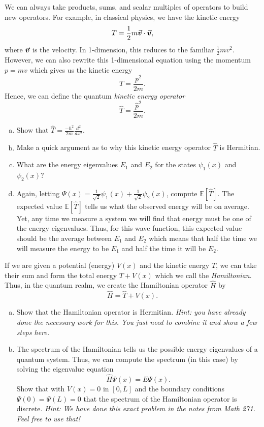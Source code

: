 \documentclass[12pt]{article} %
\begin{document}
\begin{problem}
	We can always take products, sums, and scalar multiples of operators to build new operators.  For example, in classical physics, we have the kinetic energy
	\[
	T=\frac{1}{2}m \boldsymbol{\vec{v}} \cdot \boldsymbol{\vec{v}},
	\]
	where $\boldsymbol{\vec{v}}$ is the velocity. In 1-dimension, this reduces to the familiar $\frac{1}{2}mv^2$.  However, we can also rewrite this 1-dimensional equation using the momentum $p=mv$ which gives us the kinetic energy
	\[
	T=\frac{p^2}{2m}.
	\]
	Hence, we can define the quantum \emph{kinetic energy operator}
	\[
	\hat{T}=\frac{\hat{p}^2}{2m}.
	\]
	\begin{enumerate}[(a)]
		\item Show that $\hat{T} = \frac{-\hbar^2}{2m}\frac{d^2}{dx^2}$.
		\item Make a quick argument as to why this kinetic energy operator $\hat{T}$ is Hermitian.
		\item What are the energy eigenvalues $E_1$ and $E_2$ for the states $\psi_1(x)$ and $\psi_2(x)$?
		\item Again, letting $\Psi(x)=\frac{1}{\sqrt{2}}\psi_1(x)+\frac{1}{\sqrt{2}}\psi_2(x)$, compute $\mathbb{E}[\hat{T}]$. The expected value $\mathbb{E}[\hat{T}]$ tells us what the observed energy will be on average. Yet, any time we measure a system we will find that energy must be one of the energy eigenvalues. Thus, for this wave function, this expected value should be the average between $E_1$ and $E_2$ which means that half the time we will measure the energy to be $E_1$ and half the time it will be $E_2$.
	\end{enumerate}	
\end{problem}

\begin{problem}
If we are given a potential (energy) $V(x)$ and the kinetic energy $T$, we can take their sum and form the total energy $T+V(x)$ which we call the \emph{Hamiltonian}.  Thus, in the quantum realm, we create the Hamiltonian operator $\hat{H}$ by
\[
\hat{H}=\hat{T}+V(x).
\]
\begin{enumerate}[(a)]
	\item Show that the Hamiltonian operator is Hermitian. \emph{Hint: you have already done the necessary work for this. You just need to combine it and show a few steps here.}
	\item The spectrum of the Hamiltonian tells us the possible energy eigenvalues of a quantum system. Thus, we can compute the spectrum (in this case) by solving the eigenvalue equation
	\[
	\hat{H}\Psi(x)=E\Psi(x).
	\]
	Show that with $V(x)=0$ in $[0,L]$ and the boundary conditions $\Psi(0)=\Psi(L)=0$ that the spectrum of the Hamiltonian operator is discrete.  \emph{Hint: We have done this exact problem in the notes from Math 271. Feel free to use that!}
\end{enumerate}
\end{problem}
\end{document}
